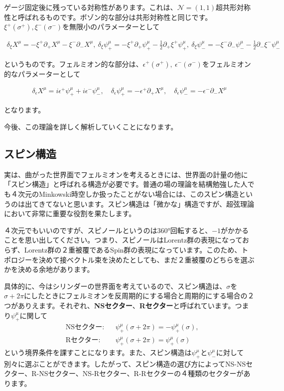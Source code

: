 \documentclass[report,paper=a4, fontsize=12pt, line_length=16cm, number_of_lines=34,dvipdfmx]{jlreq}
\newenvironment{important}{\begin{tcolorbox}[
  colback = white,
  colframe = red!35,
  boxrule = 2mm,
  fonttitle = \bfseries,
  after = \noindent] }{\end{tcolorbox}}
\numberwithin{equation}{chapter}
\numberwithin{equation}{section}
\newcommand{\Ncal}{\mathcal{N}}
\newcommand{\del}{\partial}
\newcommand{\kyou}[1]{{\sffamily \bfseries #1}}
\begin{document}
ゲージ固定後に残っている対称性があります。これは、$\Ncal=(1,1)$超共形対称性と呼ばれるものです。ボゾン的な部分は共形対称性と同じです。$\xi^{+}(\sigma^{+}),\xi^{-}(\sigma^{-})$を無限小のパラメーターとして
\begin{important}
  \begin{align}
    \delta_{\xi}X^{\mu}=-\xi^{+}\del_{+}X^{\mu}-\xi^{-}\del_{-}X^{\mu},\ 
    \delta_{\xi}\psi^{\mu}_{+}=-\xi^{+}\del_{+}\psi^{\mu}_{+}-\frac12 \del_{+}\xi^{+}\psi^{\mu}_{+},\ 
    \delta_{\xi}\psi^{\mu}_{-}=-\xi^{-}\del_{-}\psi^{\mu}_{-}-\frac12 \del_{-}\xi^{-}\psi^{\mu}_{-}
  \end{align}    
\end{important}
というものです。フェルミオン的な部分は、$\epsilon^{+}(\sigma^{+}),\ \epsilon^{-}(\sigma^{-})$をフェルミオン的なパラメーターとして
\begin{important}
  \begin{align}
    \delta_{\epsilon}X^{\mu}=i\epsilon^{+}\psi^{\mu}_{+}+i\epsilon^{-}\psi^{\mu}_{-}
    ,\quad
    \delta_{\epsilon}\psi^{\mu}_{+}=-\epsilon^{+}\del_{+}X^{\mu}
    ,\quad
    \delta_{\epsilon}\psi^{\mu}_{-}=-\epsilon^{-}\del_{-}X^{\mu}
    \label{superresidualtransformation}
  \end{align}    
\end{important}
となります。

今後、この理論を詳しく解析していくことになります。

\subsection{スピン構造}

実は、曲がった世界面でフェルミオンを考えるときには、世界面の計量の他に「スピン構造」と呼ばれる構造が必要です。普通の場の理論を結構勉強した人でも４次元のMinkowski時空しか扱ったことがない場合には、このスピン構造というのは出てきてないと思います。スピン構造は「微かな」構造ですが、超弦理論において非常に重要な役割を果たします。

４次元でもいいのですが、スピノールというのは360°回転すると、$-1$がかかることを思い出してください。つまり、スピノールはLorentz群の表現になっておらず、Lorentz群の２重被覆であるSpin群の表現になっています。このため、トポロジーを決めて接ベクトル束を決めたとしても、まだ２重被覆のどちらを選ぶかを決める余地があります。

具体的に、今はシリンダーの世界面を考えているので、スピン構造は、$\sigma$を$\sigma+2\pi$にしたときにフェルミオンを反周期的にする場合と周期的にする場合の２つがありえます。それぞれ、\kyou{NSセクター}、\kyou{Rセクター}と呼ばれています。つまり$\psi^{\mu}_{+}$に関して
\begin{align}
  &\text{NSセクター:}&& \psi^{\mu}_{+}(\sigma+2\pi)=-\psi^{\mu}_{+}(\sigma),\\
  &\text{Rセクター:}&& \psi^{\mu}_{+}(\sigma+2\pi)=\psi^{\mu}_{+}(\sigma) 
\end{align}
という境界条件を課すことになります。また、スピン構造は$\psi^{\mu}_{+}$と$\psi^{\mu}_{-}$に対して別々に選ぶことができます。したがって、スピン構造の選び方によってNS-NSセクター、R-NSセクター、NS-Rセクター、R-Rセクターの４種類のセクターがあります。
\end{document}
